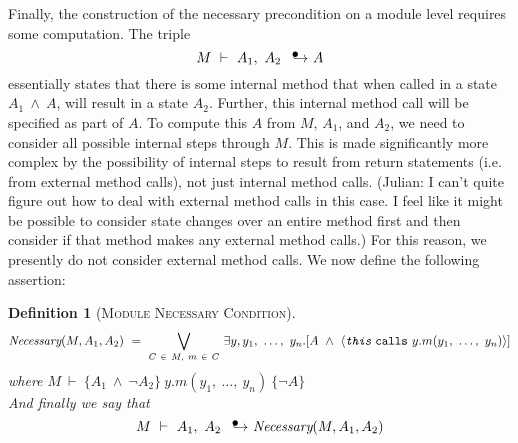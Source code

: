 \documentclass[12pt]{article}
\newcommand\intstep{\hspace{1.5mm}{\raisebox{3pt}{$\bullet$}}\hspace{-1.5mm}{\hookrightarrow}}
\newcommand\oiInternal[3]{#1,\ #2\ \intstep\ #3}
\newcommand\hoare[3]{\{#1\}\ #2\ \{#3\}}
\newcommand\hoareIf[4]{#1,\ #2,\ \{#3\}\ \intstep\ #4}
\newcommand\calls[4]{\langle #1\ \texttt{calls}\ #2.#3(#4) \rangle}
\newcommand\access[2]{\langle #1\ \texttt{access}\ #2 \rangle}
\newcommand\external[1]{\langle #1\ \texttt{external}\rangle}
\newtheorem{definition}{Definition}
\numberwithin{case}{lemma}
\numberwithin{case}{theorem}
\numberwithin{subcase}{case}
\begin{document}
{%

Finally, the construction of the necessary precondition on a module 
level requires some computation. The triple
$$M\ \vdash\ \oiInternal{A_1}{A_2}{A}$$
essentially states that there is some internal method that when 
called in a state $A_1\ \wedge\ A$, will result in a state $A_2$.
Further, this internal method call will be specified as part of 
$A$. To compute this $A$ from $M$, $A_1$, and $A_2$, we need to consider
all possible internal steps through $M$. This is made significantly more
complex by the possibility of internal steps to result from return 
statements (i.e. from external method calls), not just internal method calls.
{\color{red}(Julian: I can't quite figure out how to deal with external method 
calls in this case. I feel like it might be possible to consider state changes over an 
entire method first and then consider if that method makes any external method calls.)}
For this reason, we presently do not consider external method calls. We now define
the following assertion:
\begin{definition}[\textsc{Module Necessary Condition}]
\label{def:module_necessary}
$$\textit{Necessary}(M,A_1,A_2)\ =\ \underset{C\ \in\ M,\ m\ \in\ C}{\bigvee}\ \exists y, y_1,\ \ldots,\ y_n.[ A\ \wedge\ \calls{\emph{\texttt{this}}}{y}{m}{y_1,\ \ldots,\ y_n}]$$
\hfill where $M\ \vdash\ \hoare{A_1\ \wedge\ \neg A_2}{y.m(y_1,\ \ldots,\ y_n)}{\neg A}$\\
And finally we say that
$$M\ \vdash\ \oiInternal{A_1}{A_2}{\textit{Necessary}(M, A_1, A_2)}$$
\end{definition}

}
\end{document}
